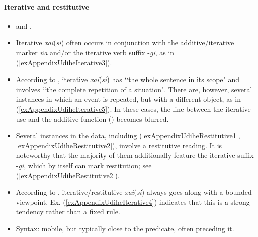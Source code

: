\paragraph{Iterative and restitutive}
\label{appendixUdiheIterative}
\begin{itemize}
	\item \textcite[439, 444–445]{NikolaevaTolskaya2001} and \textcite[78]{Schneider1936}.
	\item Iterative \mbox{\textit{xai}(\textit{si})} often occurs in conjunction with the additive/iterative marker \textit{ña} and/or the iterative verb suffix \mbox{-\textit{gi}}, as in (\ref{exAppendixUdiheIterative3}).
	\item	According to \textcite[439]{NikolaevaTolskaya2001}, iterative \mbox{\textit{xai}(\textit{si})} has \lq\lq the whole sentence in its scope" and involves \lq\lq the complete repetition of a situation". There are, however, several instances in which an event is repeated, but with a different object, as in (\ref{exAppendixUdiheIterative5}). In these cases, the line between the iterative use and the additive function () becomes blurred.
\item Several instances in the data, including (\ref{exAppendixUdiheRestitutive1}, \ref{exAppendixUdiheRestitutive2}), involve a restitutive reading. It is noteworthy that the majority of them additionally feature the iterative suffix \mbox{-\textit{gi}}, which by itself can mark restitution; see (\ref{exAppendixUdiheRestitutive2}).
	\item According to \textcite[439]{NikolaevaTolskaya2001}, iterative/restitutive \mbox{\textit{xai}(\textit{si})} always goes along with a bounded viewpoint. Ex. (\ref{exAppendixUdiheIterative4}) indicates that this is a strong tendency rather than a fixed rule.
	\item Syntax: mobile, but typically close to the predicate, often preceding it.
\end{itemize}

